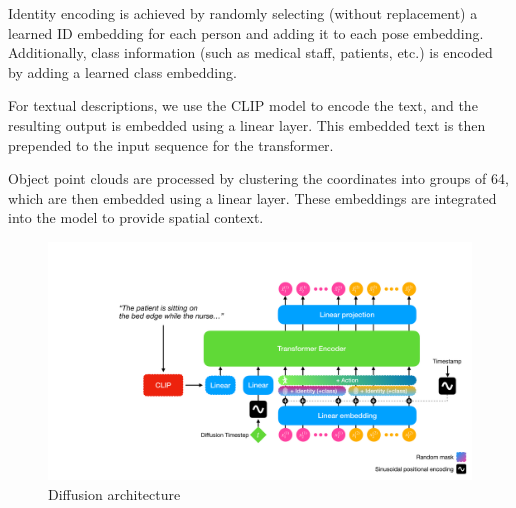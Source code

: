 Identity encoding is achieved by randomly selecting (without replacement) a learned ID embedding for each person and adding it to each pose embedding. Additionally, class information (such as medical staff, patients, etc.) is encoded by adding a learned class embedding.

For textual descriptions, we use the CLIP model to encode the text, and the resulting output is embedded using a linear layer. This embedded text is then prepended to the input sequence for the transformer.

Object point clouds are processed by clustering the coordinates into groups of 64, which are then embedded using a linear layer. These embeddings are integrated into the model to provide spatial context.

\begin{figure}[H]
    \hspace*{-1cm}
    \includegraphics[width=\linewidth+1cm]{figures/diffusion-model.pdf}
    \caption{Diffusion architecture}
    \label{fig:diffusion-model}
\end{figure}


